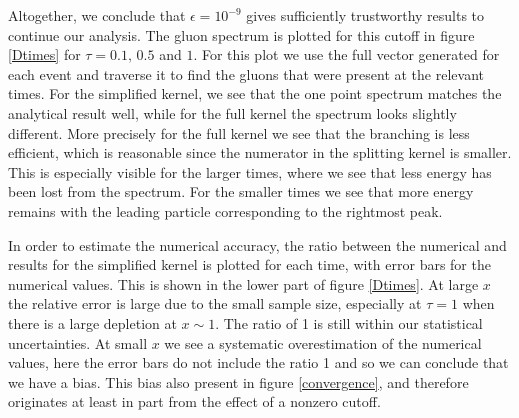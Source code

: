 \documentclass[a4paper,12pt]{article}
\numberwithin{equation}{section}
\begin{document}



Altogether, we conclude that $\epsilon=10^{-9}$ gives sufficiently trustworthy results to continue our analysis.  The gluon spectrum is plotted for this cutoff in figure \ref{Dtimes} for $\tau=0.1,\,0.5$ and $1$. For this plot we use the full vector generated for each event and traverse it to find the gluons that were present at the relevant times. For the simplified kernel, we see that the one point spectrum matches the analytical result well, while for the  full kernel the spectrum looks slightly different. More precisely for the full kernel we see that the branching is less efficient, which is reasonable since the numerator in the splitting kernel is smaller. This is especially visible for the larger times, where we see that less energy has been lost from the spectrum. For the smaller times we see that more energy remains with the leading particle corresponding to the rightmost peak.

In order to estimate the numerical accuracy, the ratio between the numerical and results for the simplified kernel is plotted for each time, with error bars for the numerical values. This is shown in the lower part of figure \ref{Dtimes}. At large $x$ the relative error is large due to the small sample size, especially at $\tau=1$ when there is a large depletion at $x \sim 1$. The ratio of 1 is still within our statistical uncertainties. At small $x$ we see a systematic overestimation of the numerical values, here the error bars do not include the ratio 1 and so we can conclude that we have a bias. This bias also present in figure \ref{convergence}, and therefore originates at least in part from the effect of a nonzero cutoff.
\end{document}
